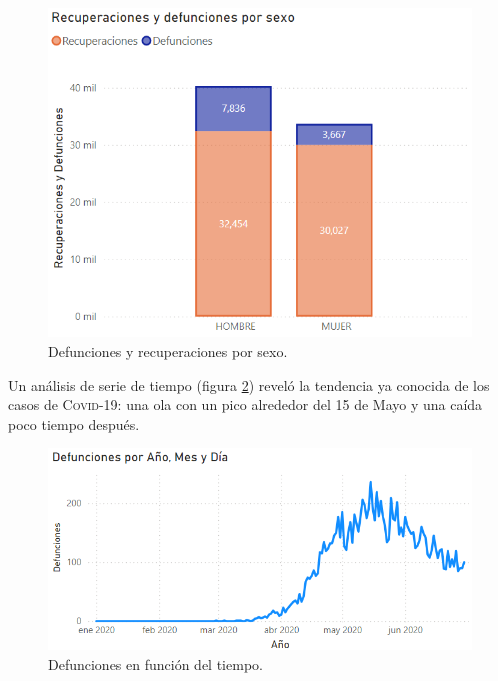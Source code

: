 \documentclass[a4paper,12pt]{article}
\begin{document}
\begin{figure}[!ht]
    \begin{center}
	\includegraphics[scale=0.6]{Def_rec_por_sexo.png}
    \end{center}
    \captionsetup{width=\linewidth}
    \caption{Defunciones y recuperaciones por sexo.}
    \label{fig:def_rec_por_sexo}
\end{figure}

Un análisis de serie de tiempo (figura \ref{fig:def_por_tiempo}) reveló la tendencia ya conocida de los casos de {\scshape Covid-19}: una ola con un pico alrededor del 15 de Mayo y una caída poco tiempo después.

\begin{figure}[!ht]
    \begin{center}
	\includegraphics[scale=0.6]{Def_por_tiempo_powerbi.png}
    \end{center}
    \captionsetup{width=\linewidth}
    \caption{Defunciones en función del tiempo.}
    \label{fig:def_por_tiempo}
\end{figure}
\end{document}
